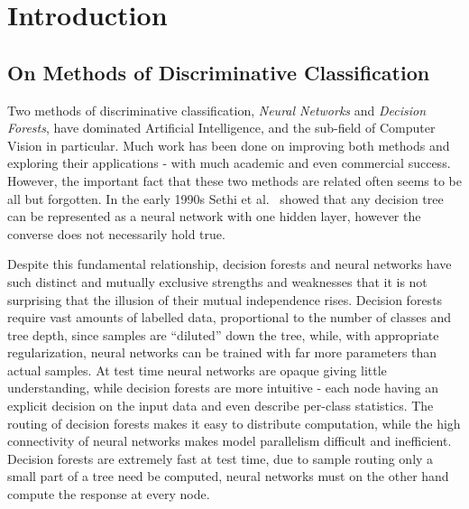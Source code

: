 \documentclass[thesis]{subfiles}
\begin{document}

\chapter{Introduction}  %

\ifpdf
    \graphicspath{{Figs/Raster/}{Figs/PDF/}{Figs/}}
\else
    \graphicspath{{Figs/Vector/}{Figs/}}
\fi


\section{On Methods of Discriminative Classification} %

Two methods of discriminative classification, \emph{Neural Networks} and \emph{Decision Forests}, have dominated Artificial Intelligence, and the sub-field of Computer Vision in particular. Much work has been done on improving both methods and exploring their applications - with much academic and even commercial success. However, the important fact that these two methods are related often seems to be all but forgotten. In the early 1990s Sethi et al.~\cite{Sethi1990} showed that any decision tree can be represented as a neural network with one hidden layer, however the converse does not necessarily hold true.

Despite this fundamental relationship, decision forests and neural networks have such distinct and mutually exclusive strengths and weaknesses that it is not surprising that the illusion of their mutual independence rises. Decision forests require vast amounts of labelled data, proportional to the number of classes and tree depth, since samples are ``diluted'' down the tree, while, with appropriate regularization, neural networks can be trained with far more parameters than actual samples. At test time neural networks are opaque giving little understanding, while decision forests are more intuitive - each node having an explicit decision on the input data and even describe per-class statistics. The routing of decision forests makes it easy to distribute computation, while the high connectivity of neural networks makes model parallelism difficult and inefficient. Decision forests are extremely fast at test time, due to sample routing only a small part of a tree need be computed, neural networks must on the other hand compute the response at every node.  
\end{document}
